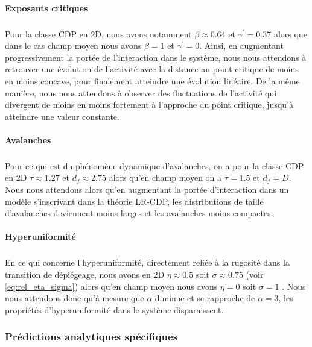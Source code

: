 \paragraph{Exposants critiques}

\subparagraph{}Pour la classe CDP en 2D, nous avons notamment $\beta\approx 0.64$ et $\gamma^\prime = 0.37$ alors que dans le cas champ moyen nous avons $\beta=1$ et $\gamma^\prime = 0$. Ainsi, en augmentant progressivement la portée de l'interaction dans le système, nous nous attendons à retrouver une évolution de l'activité avec la distance au point critique de moins en moins concave, pour finalement atteindre une évolution linéaire. De la même manière, nous nous attendons à observer des fluctuations de l'activité qui divergent de moins en moins fortement à l'approche du point critique, jusqu'à atteindre une valeur constante.

\paragraph{Avalanches}

\subparagraph{}Pour ce qui est du phénomène dynamique d'avalanches, on a pour la classe CDP en 2D $\tau\approx 1.27$ et $d_f\approx 2.75$ \cite{chessa_universality_1999, lubeck_universal_2004, chessa_critical_1999, wiese_theory_2022, rosso_depinning_2003} alors qu'en champ moyen on a $\tau = 1.5$ et $d_f=D$. Nous nous attendons alors qu'en augmentant la portée d'interaction dans un modèle s'inscrivant dans la théorie LR-CDP, les distributions de taille d'avalanches deviennent moins larges et les avalanches moins compactes.

\paragraph{Hyperuniformité}

\subparagraph{}En ce qui concerne l'hyperuniformité, directement reliée à la rugosité dans la transition de dépiégeage, nous avons en 2D $\eta \approx 0.5$ soit $\sigma \approx 0.75$ (voir \autoref{eq:rel_eta_sigma}) alors qu'en champ moyen nous avons $\eta = 0$ soit $\sigma = 1$ \cite{wiese_theory_2022}. Nous nous attendons donc qu'à mesure que $\alpha$ diminue et se rapproche de $\alpha=3$, les propriétés d'hyperuniformité dans le système disparaissent.

\subsubsection{Prédictions analytiques spécifiques}

